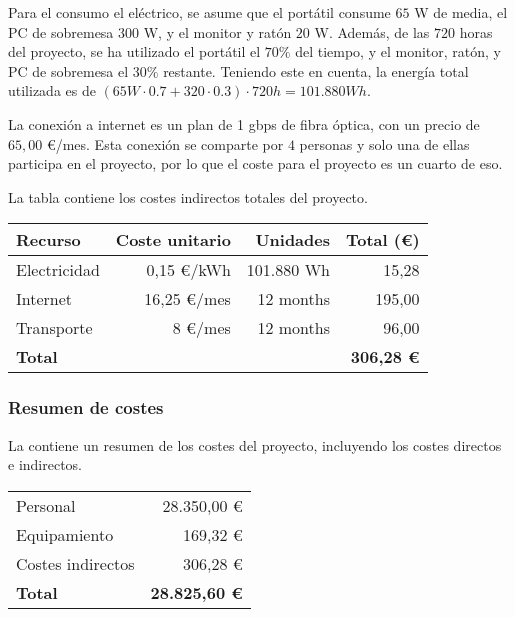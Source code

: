 Para el consumo el eléctrico, se asume que el portátil consume $65$ W de media,
el PC de sobremesa $300$ W, y el monitor y ratón $20$ W. Además, de las $720$
horas del proyecto, se ha utilizado el portátil el $70 \%$ del tiempo, y el
monitor, ratón, y PC de sobremesa el $30 \%$ restante. Teniendo este en cuenta,
la energía total utilizada es de $(65 W \cdot 0.7 + 320 \cdot 0.3) \cdot 720 h =
101.880 Wh$.

La conexión a internet es un plan de 1 gbps de fibra óptica, con un precio
de $65,00$ \euro/mes. Esta conexión se comparte por $4$ personas y solo una de
ellas participa en el proyecto, por lo que el coste para el proyecto es un
cuarto de eso.

\noindent
La tabla  contiene los costes indirectos totales del
proyecto.

\begin{table}[htb]
    {
      \begin{tabular}{lrrr}
        \toprule
        \textbf{Recurso} & \textbf{Coste unitario} & \textbf{Unidades} & \textbf{Total (\euro)} \\
        \midrule
        Electricidad &   0,15 \euro/kWh & 101.880 Wh &  15,28 \\
        Internet     &  16,25 \euro/mes &  12 months & 195,00 \\
        Transporte   &      8 \euro/mes &  12 months &  96,00 \\
        \midrule
        \textbf{Total} & & & \textbf{306,28 \euro} \\
        \bottomrule
      \end{tabular}
    }
\end{table}

\subsubsection{Resumen de costes}\label{subsubsec:costs-summary}

\noindent
La  contiene un resumen de los costes del proyecto,
incluyendo los costes directos e indirectos.

\begin{table}[htb]
    {
      \begin{tabular}{lr}
        \toprule
        Personal          & 28.350,00 \euro \\
        Equipamiento      &    169,32 \euro \\
        Costes indirectos &    306,28 \euro \\
        \midrule
        \textbf{Total}    & \textbf{28.825,60 \euro} \\
        \bottomrule
      \end{tabular}
    }
\end{table}

